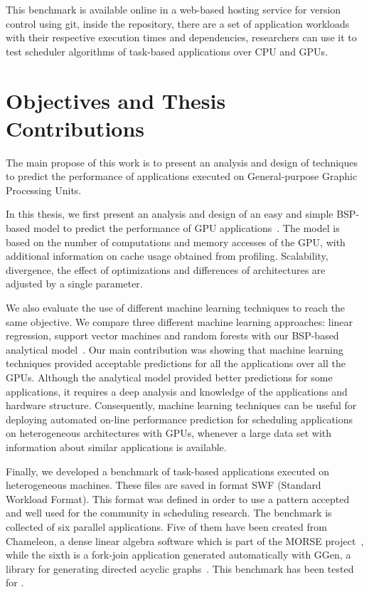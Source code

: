 This benchmark is available online in a web-based hosting service for version control using git, inside the repository, there are a set of application workloads with their respective execution times and dependencies, researchers can use it to test scheduler algorithms of task-based applications over CPU and GPUs. 


\section{Objectives and Thesis Contributions}
The main propose of this work is to present an analysis and design of techniques to predict the performance of applications executed on General-purpose Graphic Processing Units.

In this thesis, we first present an analysis and design of an easy and simple BSP-based model to predict the performance of GPU applications~\citep{amaris:2015:HiPC}. The model is based on the number of computations and memory accesses of the GPU, with additional information on cache usage obtained from profiling. Scalability, divergence, the effect of optimizations and differences of architectures are adjusted by a single parameter.

We also evaluate the use of different machine learning techniques to reach the same objective. We compare three different machine learning approaches: linear regression, support vector machines and random forests with our BSP-based analytical model~\citep{amaris:2016:NCA}. Our main contribution was showing that machine learning techniques provided acceptable predictions for all the applications over all the GPUs. Although the analytical model provided better predictions for some applications, it requires a deep analysis and knowledge of the applications and hardware structure. Consequently, machine learning techniques can be useful for deploying automated on-line performance prediction for scheduling applications on heterogeneous architectures with GPUs, whenever a large data set with information about similar applications is available.

Finally, we developed a benchmark of task-based applications executed on heterogeneous machines. These files are saved in format SWF (Standard Workload Format). This format was defined in order to use a pattern accepted and well used for the community in scheduling research. The benchmark is collected of six parallel applications. Five of them have been created from Chameleon, a dense linear algebra software which is part of the MORSE project~\citep{agullo2012morse}, while the sixth is a fork-join application generated automatically with GGen, a library for generating directed acyclic graphs~\citep{GGen:simutools10}. This benchmark has been tested for \citep{mommessin:2017, mommesin:2017:CCPE}. 

